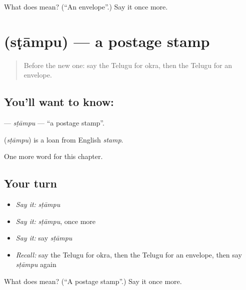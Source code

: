 \begin{tcolorbox}[breakable,colback=teal!4,colframe=teal!35!black,title={Before you move on}]
What does  mean? (\textquotedblleft{}An envelope\textquotedblright{}.) Say it once more.
\end{tcolorbox}
\section[\texorpdfstring{\te{స్టాంపు} (sṭāmpu)}{స్టాంపు (sṭāmpu)}]{ (sṭāmpu) — a postage stamp}

\label{lesson:TE-C185-stampu}



\begin{quote}
Before the new one: say the Telugu for okra, then the Telugu for an envelope.
\end{quote}

\subsection*{You'll want to know: }
\textbf{} — \emph{sṭāmpu} — \textquotedblleft{}a postage stamp\textquotedblright{}.

\begin{cousinweb}
\textbf{} (\emph{sṭāmpu}) is a loan from English \emph{stamp}.
\end{cousinweb}

\begin{grammarlens}[title={What you've built}]
One more word for this chapter.
\end{grammarlens}

\subsection*{Your turn}
\begin{itemize}
\raggedright
  \item \emph{Say it:} \emph{sṭāmpu}
  \item \emph{Say it:} \emph{sṭāmpu}, once more
  \item \emph{Say it:} say \emph{sṭāmpu}
  \item \emph{Recall:} say the Telugu for okra, then the Telugu for an envelope, then say \emph{sṭāmpu} again
\end{itemize}

\begin{tcolorbox}[breakable,colback=teal!4,colframe=teal!35!black,title={Before you move on}]
What does  mean? (\textquotedblleft{}A postage stamp\textquotedblright{}.) Say it once more.
\end{tcolorbox}
